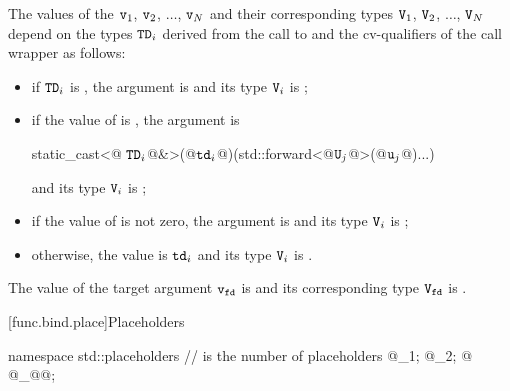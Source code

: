 \pnum
{}%
The values of the  $\texttt{\protect v}_1$, $\texttt{\protect v}_2$, $\dotsc$, $\texttt{\protect v}_N$ and their
corresponding types $\texttt{\protect V}_1$, $\texttt{\protect V}_2$, $\dotsc$, $\texttt{\protect V}_N$ depend on the
types $\texttt{\protect TD}_i$ derived from
the call to  and the
cv-qualifiers \cv{} of the call wrapper  as follows:
\begin{itemize}
\item if $\texttt{\protect TD}_i$ is , the
argument is  and its type $\texttt{\protect V}_i$ is ;

\item if the value of 
is , the argument is
\begin{codeblock}
static_cast<@\cv{} $\texttt{\protect TD}_i$@&>(@$\texttt{\protect td}_i$@)(std::forward<@$\texttt{\protect U}_j$@>(@$\texttt{\protect u}_j$@)...)
\end{codeblock}
and its type $\texttt{\protect V}_i$ is
;

\item if the value  of 
is not zero, the  argument is 
and its type $\texttt{\protect V}_i$
is ;

\item otherwise, the value is $\texttt{\protect td}_i$ and its type $\texttt{\protect V}_i$
is .
\end{itemize}

\pnum
The value of the target argument $\texttt{\protect v}_{\texttt{\protect fd}}$ is  and
its corresponding type $\texttt{\protect V}_{\texttt{\protect fd}}$ is .
%

[func.bind.place]{Placeholders}

%
%
%
%
%
%
%
%
%
%
%
\begin{codeblock}
namespace std::placeholders {
  //  is the number of placeholders
  @\seebelow@ _1;
  @\seebelow@ _2;
             @\itcorr\vdots@
  @\seebelow@ _@@;
}
\end{codeblock}

